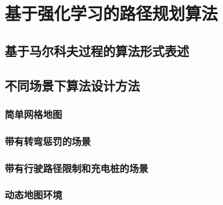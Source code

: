 \documentclass{standalone}
\begin{document}
	
\chapter{基于强化学习的路径规划算法}
\section{基于马尔科夫过程的算法形式表述}
\section{不同场景下算法设计方法}
\subsection{简单网格地图}
\subsection{带有转弯惩罚的场景}
\subsection{带有行驶路径限制和充电桩的场景}
\subsection{动态地图环境}
\end{document}
